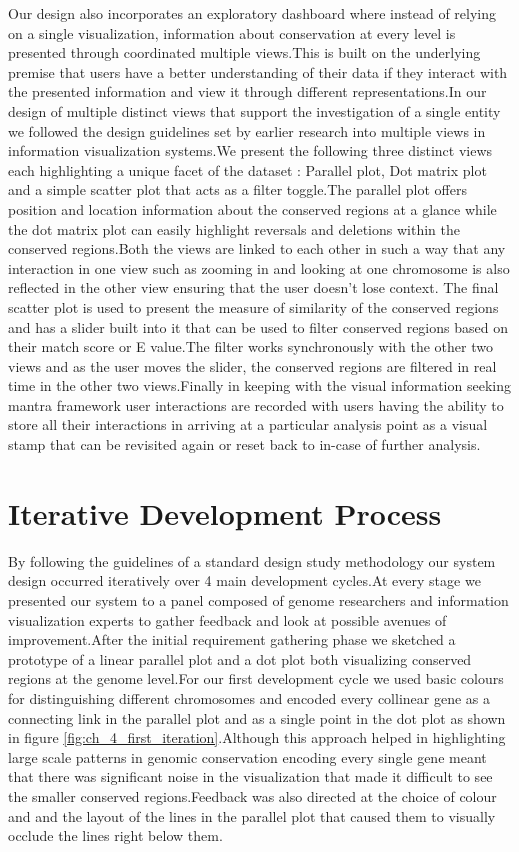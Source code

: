 Our design also incorporates an exploratory dashboard where instead of relying on a single visualization, information about conservation at every level is presented through coordinated multiple views.This is built on the underlying premise that users have a better understanding of their data if they interact with the presented information and view it through different representations\cite{Roberts}.In our design of multiple distinct views that support the investigation of a single entity we followed the design guidelines set by earlier research into multiple views in information visualization systems\cite{WangBaldonado}.We present the following three distinct views each highlighting a unique facet of the dataset : Parallel plot, Dot matrix plot and a simple scatter plot that acts as a filter toggle.The parallel plot offers position and location information about the conserved regions at a glance while the dot matrix plot can easily highlight reversals and deletions within the conserved regions.Both the views are linked to each other in such a way that any interaction in one view such as zooming in and looking at one chromosome is also reflected in the other view ensuring that the user doesn't lose context. The final scatter plot is used to present the measure of similarity of the conserved regions and has a slider built into it that can be used to filter conserved regions based on their match score or E value.The filter works synchronously with the other two views and as the user moves the slider, the conserved regions are filtered in real time in the other two views.Finally in keeping with the visual information seeking mantra framework user interactions are recorded with users having the ability to store all their interactions in arriving at a particular analysis point as a visual stamp that can be revisited again or reset back to in-case of further analysis.

\section{Iterative Development Process}
By following the guidelines of a standard design study methodology\cite{5290695} our system design occurred iteratively over 4 main development cycles.At every stage we presented our system to a panel composed of genome researchers and information visualization experts to gather feedback and look at possible avenues of improvement.After the initial requirement gathering phase we sketched a prototype of a linear parallel plot and a dot plot both visualizing conserved regions at the genome level.For our first development cycle we used basic colours for distinguishing different chromosomes and encoded every collinear gene as a connecting link in the parallel plot and as a single point in the dot plot as shown in figure \ref{fig:ch_4_first_iteration}.Although this approach helped in highlighting large scale patterns in genomic conservation encoding every single gene meant that there was significant noise in the visualization that made it difficult to see the smaller conserved regions.Feedback was also directed at the choice of colour and and the layout of the lines in the parallel plot that caused them to visually occlude the lines right below them.

